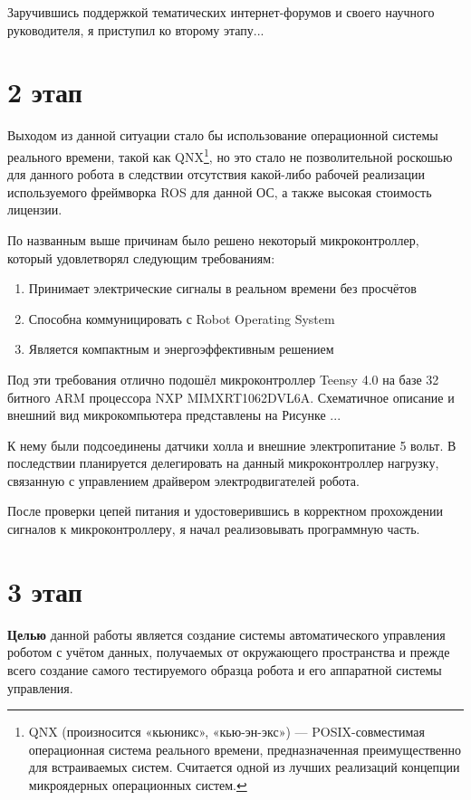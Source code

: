 \documentclass[12pt,a4paper]{scrartcl}
\begin{document}
			Заручившись поддержкой тематических интернет-форумов и своего научного руководителя, я приступил ко второму этапу...
			
		\section*{2 этап}
			Выходом из данной ситуации стало бы использование операционной системы реального времени, такой как QNX\footnote{QNX (произносится «кьюникс», «кью-эн-экс») — POSIX-совместимая операционная система реального времени, предназначенная преимущественно для встраиваемых систем. Считается одной из лучших реализаций концепции микроядерных операционных систем.}, но это стало не позволительной роскошью для данного робота в следствии отсутствия какой-либо рабочей реализации используемого фреймворка ROS для данной ОС, а также высокая стоимость лицензии.
			
			По названным выше причинам было решено некоторый микроконтроллер, который удовлетворял следующим требованиям:
			\begin{enumerate}
				\item Принимает электрические сигналы в реальном времени без просчётов
				\item Способна коммуницировать с Robot Operating System
				\item Является компактным и энергоэффективным решением
			\end{enumerate}
			
			Под эти требования отлично подошёл микроконтроллер Teensy 4.0 на базе 32 битного ARM процессора NXP MIMXRT1062DVL6A. Схематичное описание и внешний вид микрокомпьютера представлены на Рисунке ...
			
			К нему были подсоединены датчики холла и внешние электропитание 5 вольт. В последствии планируется делегировать на данный микроконтроллер нагрузку, связанную с управлением драйвером электродвигателей робота.
			
			После проверки цепей питания и удостоверившись в корректном прохождении сигналов к микроконтроллеру, я начал реализовывать программную часть.
			
		\section*{3 этап}
			
			
			\textbf{Целью} данной работы является создание системы автоматического управления роботом с учётом данных, получаемых от окружающего пространства и прежде всего создание самого тестируемого образца робота и его аппаратной системы управления. \\
			
\end{document}
